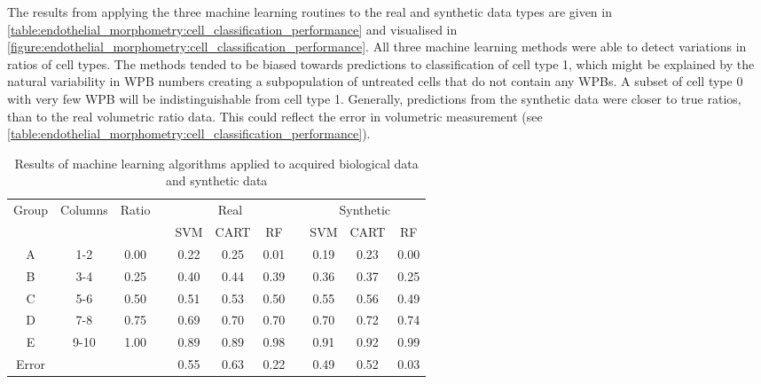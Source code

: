 The results from applying the three machine learning routines to the real and synthetic data types are given in \autoref{table:endothelial_morphometry:cell_classification_performance} and visualised in \autoref{figure:endothelial_morphometry:cell_classification_performance}. All three machine learning methods were able to detect variations in ratios of cell types. The methods tended to be biased towards predictions to classification of cell type 1, which might be explained by the natural variability in WPB numbers creating a subpopulation of untreated cells that do not contain any WPBs. A subset of cell type 0 with very few WPB will be indistinguishable from cell type 1. Generally, predictions from the synthetic data were closer to true ratios, than to the real volumetric ratio data. This could reflect the error in volumetric measurement (see \autoref{table:endothelial_morphometry:cell_classification_performance}).

\begin{table}[htbp!]
\centering
\caption[Mixed ratios cell classification machine learning performance]{Results of machine learning algorithms applied to acquired biological data and synthetic data}
\label{table:endothelial_morphometry:cell_classification_performance}
\begin{tabular}{c c c c c c c c c c c}
\toprule
\multirow{2}{*}{Group} & \multirow{2}{*}{Columns} & \multirow{2}{*}{Ratio} & & \multicolumn{3}{c}{Real} & & \multicolumn{3}{c}{Synthetic}\\
\cmidrule{5-7}
\cmidrule{9-11}
	& & & & SVM & CART & RF & & SVM & CART & RF\\
\midrule
	A & 1-2 & 0.00 & & 0.22 & 0.25 & 0.01 & & 0.19 & 0.23 & 0.00 \\
	B & 3-4 & 0.25 & & 0.40 & 0.44 & 0.39 & & 0.36 & 0.37 & 0.25 \\
	C & 5-6 & 0.50 & & 0.51 & 0.53 & 0.50 & & 0.55 & 0.56 & 0.49 \\
	D & 7-8 & 0.75 & & 0.69 & 0.70 & 0.70 & & 0.70 & 0.72 & 0.74 \\
	E & 9-10 &1.00 & & 0.89 & 0.89 & 0.98 & & 0.91 & 0.92 & 0.99 \\
\midrule
	Error & & & & 0.55 & 0.63 & 0.22 & & 0.49 & 0.52 & 0.03 \\
\bottomrule
\end{tabular}
\end{table}

